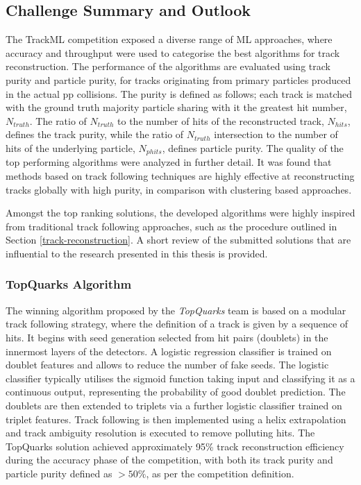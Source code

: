 
\subsection{Challenge Summary and Outlook}
\label{trackml-key-findings}

The TrackML competition exposed a diverse range of ML approaches, where accuracy and throughput were used to categorise the best algorithms for track reconstruction. The performance of the algorithms are evaluated using track purity and particle purity, for tracks originating from primary particles produced in the actual pp collisions. The purity is defined as follows; each track is matched with the ground truth majority particle sharing with it the greatest hit number, $N_{truth}$. The ratio of $N_{truth}$ to the number of hits of the reconstructed track, $N_{hits}$, defines the track purity, while the ratio of $N_{truth}$ intersection to the number of hits of the underlying particle, $N_{phits}$, defines particle purity. The quality of the top performing algorithms were analyzed in further detail. It was found that methods based on track following techniques are highly effective at reconstructing tracks globally with high purity, in comparison with clustering based approaches. 

Amongst the top ranking solutions, the developed algorithms were highly inspired from traditional track following approaches, such as the procedure outlined in Section \ref{track-reconstruction}. A short review of the submitted solutions that are influential to the research presented in this thesis is provided.

\subsubsection{TopQuarks Algorithm}

The winning algorithm proposed by the \textit{TopQuarks} team is based on a modular track following strategy, where the definition of a track is given by a sequence of hits. It begins with seed generation selected from hit pairs (doublets) in the innermost layers of the detectors. A logistic regression classifier is trained on doublet features and allows to reduce the number of fake seeds. The logistic classifier typically utilises the sigmoid function taking input and classifying it as a continuous output, representing the probability of good doublet prediction. The doublets are then extended to triplets via a further logistic classifier trained on triplet features. Track following is then implemented using a helix extrapolation and track ambiguity resolution is executed to remove polluting hits. The TopQuarks solution achieved approximately 95\% track reconstruction efficiency during the accuracy phase of the competition, with both its track purity and particle purity defined as $> 50\%$, as per the competition definition.

